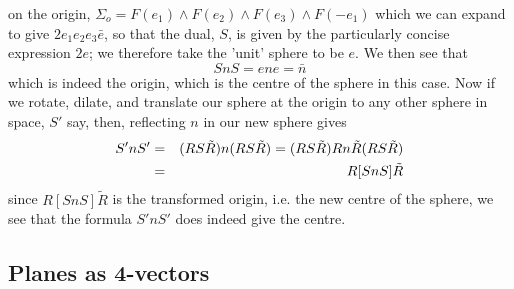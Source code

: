 on the origin, $\Sigma_o = F(e_1)\wedge F(e_2)\wedge
F(e_3)\wedge F(-e_1)$ which we can expand to give
$2e_1e_2e_3\bar{e}$, so that the dual, $S$, is given by
the particularly concise expression $2e$; we therefore
take the 'unit' sphere to be $e$. We then see that
%
\begin{equation}
  SnS = ene = \bar{n}
\end{equation}
%
which is indeed the origin, which is the centre of the
sphere in this case. Now if we rotate, dilate, and
translate our sphere at the origin to any other sphere in
space, $S'$ say, then, reflecting $n$ in our new sphere
gives
%
\begin{eqnarray}
  S'nS'&  = &
  (RS\tilde{R})n(RS\tilde{R})=(RS\tilde{R})Rn\tilde{R}(RS\tilde{R})\nonumber
  \\
  & = & R[SnS]\tilde{R}
\end{eqnarray}
%
since $R[SnS]\tilde{R}$ is the transformed origin, i.e.
the new centre of the sphere, we see that the formula
$S'nS'$ does indeed give the centre.




\subsection{Planes as 4-vectors}
\label{sec:planes}

